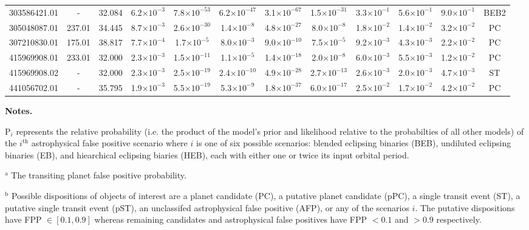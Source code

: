 \begin{landscape}
\begin{table*}
\begin{tabular}{cc|cc|cccccccc}
    303586421.01 & - & 32.084 & 6.2$\times 10^{-3}$ & 7.8$\times 10^{-53}$ & 6.2$\times 10^{-47}$ & 3.1$\times 10^{-67}$ & 1.5$\times 10^{-31}$ & 3.3$\times 10^{-1}$ & 5.6$\times 10^{-1}$ & 9.0$\times 10^{-1}$ & BEB2 \\ 
    305048087.01 & 237.01 & 34.445 & 8.7$\times 10^{-3}$ & 2.6$\times 10^{-30}$ & 1.4$\times 10^{-8}$ & 4.8$\times 10^{-27}$ & 8.0$\times 10^{-8}$ & 1.8$\times 10^{-2}$ & 1.4$\times 10^{-2}$ & 3.2$\times 10^{-2}$ & PC \\ 
    307210830.01 & 175.01 & 38.817 & 7.7$\times 10^{-4}$ & 1.7$\times 10^{-5}$ & 8.0$\times 10^{-3}$ & 9.0$\times 10^{-10}$ & 7.5$\times 10^{-5}$ & 9.2$\times 10^{-3}$ & 4.3$\times 10^{-3}$ & 2.2$\times 10^{-2}$ & PC \\ 
    415969908.01 & 233.01 & 32.000 & 2.3$\times 10^{-3}$ & 1.5$\times 10^{-11}$ & 1.1$\times 10^{-5}$ & 1.4$\times 10^{-18}$ & 2.0$\times 10^{-8}$ & 6.0$\times 10^{-3}$ & 5.5$\times 10^{-3}$ & 1.2$\times 10^{-2}$ & PC \\ 
    415969908.02 & - & 32.000 & 2.3$\times 10^{-3}$ & 2.5$\times 10^{-19}$ & 2.4$\times 10^{-10}$ & 4.9$\times 10^{-28}$ & 2.7$\times 10^{-13}$ & 2.6$\times 10^{-3}$ & 2.0$\times 10^{-3}$ & 4.7$\times 10^{-3}$ & ST \\ 
    441056702.01 & - & 35.795 & 1.9$\times 10^{-3}$ & 5.5$\times 10^{-19}$ & 5.3$\times 10^{-9}$ & 1.8$\times 10^{-37}$ & 6.0$\times 10^{-17}$ & 2.5$\times 10^{-2}$ & 1.7$\times 10^{-2}$ & 4.2$\times 10^{-2}$ & PC \\ 
  \end{tabular}
  \begin{list}{}{}
    \item {\bf{Notes.}}
      \item P$_i$ represents the relative probability (i.e. the product of the model's prior and likelihood relative to the probabilties of all other models) of the $i^{\text{th}}$ astrophysical false positive scenario where $i$ is one of six possible scenarios: blended eclipsing binaries (BEB), undiluted eclipsing binaries (EB), and hiearchical eclipsing biaries (HEB), each with either one or twice its input orbital period.
\item $^{\text{a}}$ The transiting planet false positive probability.
\item $^{\text{b}}$ Possible dispositions of objects of interest are a planet candidate (PC), a putative planet candidate (pPC), a single transit event (ST), a putative single transit event (pST), an unclassifed astrophysical false positive (AFP), or any of the scenarios $i$. The putative dispositions have FPP $\in [0.1,0.9]$ whereas remaining candidates and astrophysical false positives have FPP $<0.1$ and $>0.9$ respectively.

\end{list}
\end{table*}
\end{landscape}
